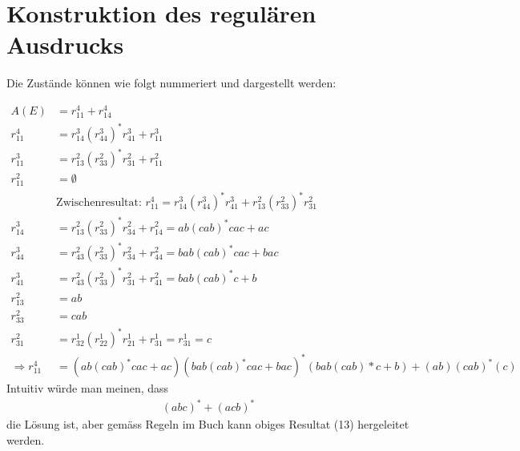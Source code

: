 \documentclass[a4paper,10pt,headlines=3.2]{scrartcl}
\begin{document}
\section{Konstruktion des regulären Ausdrucks}
Die Zustände können wie folgt nummeriert und dargestellt werden:
\begin{center}
\end{center}

\begin{align}
A(E) &= r^{4}_{11} + r^{4}_{14} \\
r^{4}_{11} &= r^{3}_{14} (r^{3}_{44})^{*} r^{3}_{41} + r^{3}_{11} \\
r^{3}_{11} &= r^{2}_{13} (r^{2}_{33})^{*} r^{2}_{31} + r^{2}_{11} \\
r^{2}_{11} &= \emptyset \\
&\text{Zwischenresultat: } r^{4}_{11} = r^{3}_{14} (r^{3}_{44})^{*} r^{3}_{41} + r^{2}_{13} (r^{2}_{33})^{*} r^{2}_{31} \\
r^{3}_{14} &= r^{2}_{13} (r^{2}_{33})^{*} r^{2}_{34} + r^{2}_{14} = ab (cab)^{*} cac + ac \\
r^{3}_{44} &= r^{2}_{43} (r^{2}_{33})^{*} r^{2}_{34} + r^{2}_{44} = bab (cab)^{*} cac + bac \\
r^{3}_{41} &= r^{2}_{43} (r^{2}_{33})^{*} r^{2}_{31} + r^{2}_{41} = bab (cab)^{*} c + b \\
r^{2}_{13} &= ab \\
r^{2}_{33} &= cab \\
r^{2}_{31} &= r^{1}_{32} (r^{1}_{22})^{*} r^{1}_{21} + r^{1}_{31} = r^{1}_{31} = c \\
\Rightarrow r^{4}_{11} &= (ab (cab)^{*} cac + ac) (bab (cab)^{*} cac + bac)^{*} (bab (cab)* c + b ) + (ab) (cab)^{*} (c)
\end{align}
Intuitiv würde man meinen, dass
\begin{align}
(abc)^{*} + (acb)^{*}
\end{align}
die Lösung ist, aber gemäss Regeln im Buch kann obiges Resultat (13) hergeleitet werden.
\end{document}
